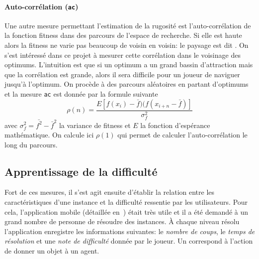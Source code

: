 \documentclass[../main.tex]{subfiles}
\begin{document}
	\paragraph{Auto-corrélation (\texttt{ac})}{Une autre mesure permettant l'estimation de la rugosité est l'auto-corrélation de la fonction fitness dans des parcours de l'espace de recherche. Si elle est haute alors la fitness ne varie pas beaucoup de voisin en voisin: le paysage est dit . On s'est intéressé dans ce projet à mesurer cette corrélation dans le voisinage des optimums. L'intuition est que si un optimum a un grand bassin d'attraction mais que la corrélation est grande, alors il sera difficile pour un joueur de naviguer jusqu'à l'optimum. On procède à des parcours aléatoires en partant d'optimums et la mesure \texttt{ac} est donnée par la formule suivante \cite{pitzer}
	\begin{equation*}
    \rho(n) = \frac{E\left[f(x_i) - \bar{f})(f(x_{i+n} - \bar{f})\right]}{
        \sigma_f^2    
    }
	\end{equation*}
	avec $\sigma_f^2 = \bar{f^2} - \bar{f}^2$ la variance de fitness et $E$ la fonction d'espérance mathématique. On calcule ici $\rho(1)$ qui permet de calculer l'auto-corrélation le long du parcours.
	}
	
	\subsection{Apprentissage de la difficulté}
	
	Fort de ces mesures, il s'est agit ensuite d'établir la relation entre les caractéristiques d'une instance et la difficulté ressentie par les utilisateurs. Pour cela, l'application mobile (détaillée en~) était très utile et il a été demandé à un grand nombre de personne de résoudre des instances. À chaque niveau résolu l'application enregistre les informations suivantes: le \textit{nombre de coups}, le \textit{temps de résolution} et une \textit{note de difficulté} donnée par le joueur. Un  correspond à l'action de donner un objet à un agent.
	
\end{document}
